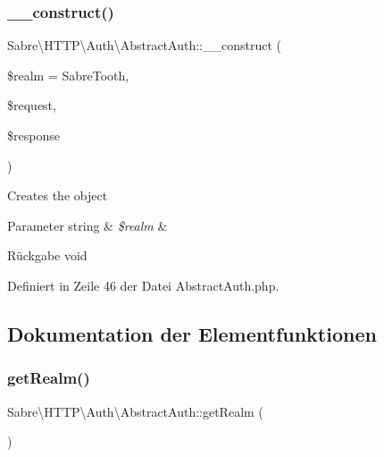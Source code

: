 \subsubsection{\texorpdfstring{\+\_\+\+\_\+construct()}{\_\_construct()}}
{\footnotesize\ttfamily Sabre\textbackslash{}\+H\+T\+T\+P\textbackslash{}\+Auth\textbackslash{}\+Abstract\+Auth\+::\+\_\+\+\_\+construct (\begin{DoxyParamCaption}\item[{}]{\$realm = {\ttfamily \textquotesingle{}SabreTooth\textquotesingle{}},  }\item[{\mbox{\hyperlink{interface_sabre_1_1_h_t_t_p_1_1_request_interface}{Request\+Interface}}}]{\$request,  }\item[{\mbox{\hyperlink{interface_sabre_1_1_h_t_t_p_1_1_response_interface}{Response\+Interface}}}]{\$response }\end{DoxyParamCaption})}

Creates the object


\begin{DoxyParams}[1]{Parameter}
string & {\em \$realm} & \\
\hline
\end{DoxyParams}
\begin{DoxyReturn}{Rückgabe}
void 
\end{DoxyReturn}


Definiert in Zeile 46 der Datei Abstract\+Auth.\+php.



\subsection{Dokumentation der Elementfunktionen}
\mbox{\label{class_sabre_1_1_h_t_t_p_1_1_auth_1_1_abstract_auth_ac2cae42eda3dfb5e4ddb18dec56e34d2}} 
\subsubsection{\texorpdfstring{get\+Realm()}{getRealm()}}
{\footnotesize\ttfamily Sabre\textbackslash{}\+H\+T\+T\+P\textbackslash{}\+Auth\textbackslash{}\+Abstract\+Auth\+::get\+Realm (\begin{DoxyParamCaption}{ }\end{DoxyParamCaption})}

